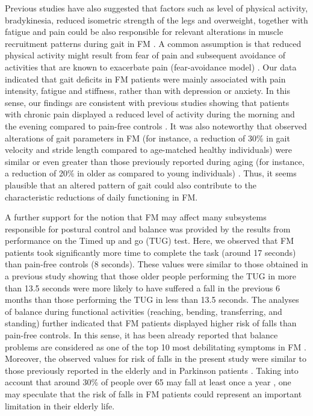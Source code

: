 \documentclass[12pt]{article}
\begin{document}
Previous studies have also suggested that factors such as level of physical activity, bradykinesia, reduced isometric strength of the legs and overweight, together with fatigue and pain could be also responsible for relevant alterations in muscle recruitment patterns during gait in FM \cite{pierrynowski2005women,jimenez2009spatial,auvinet2006gait}. A common assumption is that reduced physical activity might result from fear of pain and subsequent avoidance of activities that are known to exacerbate pain (fear-avoidance model) \cite{leeuw2007fear, vlaeyen2000fear}. Our data indicated that gait deficits in FM patients were mainly associated with pain intensity, fatigue and stiffness, rather than with depression or anxiety. In this sense, our findings are consistent with previous studies showing that patients with chronic pain displayed a reduced level of activity during the morning and the evening compared to pain-free controls \cite{weering2009daily}. It was also noteworthy that observed alterations of gait parameters in FM (for instance, a reduction of 30\% in gait velocity and stride length compared to age-matched healthy individuals) were similar or even greater than those previously reported during aging (for instance, a reduction of 20\% in older as compared to young individuals) \cite{elble1991stride, li2011virtual}. Thus, it seems plausible that an altered pattern of gait could also contribute to the characteristic reductions of daily functioning in FM.

A further support for the notion that FM may affect many subsystems responsible for postural control and balance was provided by the results from performance on the Timed up and go (TUG) test. Here, we observed that FM patients took significantly more time to complete the task (around 17 seconds) than pain-free controls (8 seconds). These values were similar to those obtained in a previous study \cite{Shumway-Cook2000} showing that those older people performing the TUG in more than 13.5 seconds were more likely to have suffered a fall in the previous 6 months than those performing the TUG in less than 13.5 seconds. The analyses of balance during functional activities (reaching, bending, transferring, and standing) further indicated that FM patients displayed higher risk of falls than pain-free controls. In this sense, it has been already reported that balance problems are considered as one of the top 10 most debilitating symptoms in FM \cite{bennett2007internet}. Moreover, the observed values for risk of falls in the present study were similar to those previously reported in the elderly \cite{berg1991measuring, panton2006comparison} and in Parkinson patients \cite{dibble2008diagnosis}. Taking into account that around 30\% of people over 65 may fall at least once a year \cite{mannerkorpi1994physical, sylliaas2009does}, one may speculate that the risk of falls in FM patients could represent an important limitation in their elderly life.
\end{document}
